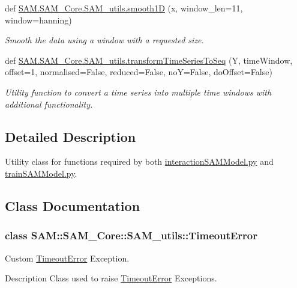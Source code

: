 \begin{DoxyCompactItemize}
def \hyperlink{group__icubclient__SAM__utils_ga993c63ecfc9099d2e2ccd42282354de5}{S\+A\+M.\+S\+A\+M\+\_\+\+Core.\+S\+A\+M\+\_\+utils.\+smooth1D} (x, window\+\_\+len=11, window=\textquotesingle{}hanning\textquotesingle{})
\begin{DoxyCompactList}\small\item\em Smooth the data using a window with a requested size. \end{DoxyCompactList}\item 
def \hyperlink{group__icubclient__SAM__utils_ga54c327e56dfec748f1c4a150b9180162}{S\+A\+M.\+S\+A\+M\+\_\+\+Core.\+S\+A\+M\+\_\+utils.\+transform\+Time\+Series\+To\+Seq} (Y, time\+Window, offset=1, normalised=False, reduced=False, noY=False, do\+Offset=False)
\begin{DoxyCompactList}\small\item\em Utility function to convert a time series into multiple time windows with additional functionality. \end{DoxyCompactList}\end{DoxyCompactItemize}


\subsection{Detailed Description}
Utility class for functions required by both \hyperlink{interactionSAMModel_8py}{interaction\+S\+A\+M\+Model.\+py} and \hyperlink{trainSAMModel_8py}{train\+S\+A\+M\+Model.\+py}. 



\subsection{Class Documentation}
\label{classSAM_1_1SAM__Core_1_1SAM__utils_1_1TimeoutError}
\subsubsection{class S\+AM\+:\+:S\+A\+M\+\_\+\+Core\+:\+:S\+A\+M\+\_\+utils\+:\+:Timeout\+Error}
Custom \hyperlink{group__icubclient__SAM__utils_classSAM_1_1SAM__Core_1_1SAM__utils_1_1TimeoutError}{Timeout\+Error} Exception. 

\begin{DoxyParagraph}{Description}
Class used to raise \hyperlink{group__icubclient__SAM__utils_classSAM_1_1SAM__Core_1_1SAM__utils_1_1TimeoutError}{Timeout\+Error} Exceptions. 
\end{DoxyParagraph}


